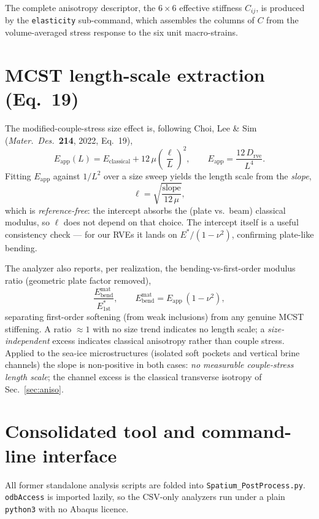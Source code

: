 \documentclass[11pt]{article}
\newcommand{\code}[1]{\texttt{\small #1}}
\begin{document}
The complete anisotropy descriptor, the $6\times6$ effective stiffness
$C_{ij}$, is produced by the \code{elasticity} sub-command, which assembles the
columns of $C$ from the volume-averaged stress response to the six unit
macro-strains.

\section{MCST length-scale extraction (Eq.~19)}
\label{sec:eq19}
The modified-couple-stress size effect is, following Choi, Lee \& Sim
(\textit{Mater.\ Des.}\ \textbf{214}, 2022, Eq.~19),
\begin{equation}
  E_\text{app}(L)=E_\text{classical}+12\,\mu\left(\frac{\ell}{L}\right)^{2},
  \qquad E_\text{app}=\frac{12\,D_\text{rve}}{L^{4}} .
  \label{eq:eq19}
\end{equation}
Fitting $E_\text{app}$ against $1/L^2$ over a size sweep yields the length scale
from the \emph{slope},
\begin{equation}
  \ell=\sqrt{\frac{\text{slope}}{12\,\mu}},
\end{equation}
which is \emph{reference-free}: the intercept absorbs the (plate vs.\ beam)
classical modulus, so $\ell$ does not depend on that choice. The intercept itself
is a useful consistency check --- for our RVEs it lands on $E^\ast/(1-\nu^2)$,
confirming plate-like bending.

The analyzer also reports, per realization, the bending-vs-first-order modulus
ratio (geometric plate factor removed),
\begin{equation}
  \frac{E_\text{bend}^\text{mat}}{E^\ast_\text{1st}},
  \qquad E_\text{bend}^\text{mat}=E_\text{app}\,(1-\nu^2),
\end{equation}
separating first-order softening (from weak inclusions) from any genuine MCST
stiffening. A ratio $\approx 1$ with no size trend indicates no length scale;
a \emph{size-independent} excess indicates classical anisotropy rather than
couple stress. Applied to the sea-ice microstructures (isolated soft pockets and
vertical brine channels) the slope is non-positive in both cases: \emph{no
measurable couple-stress length scale}; the channel excess is the classical
transverse isotropy of Sec.~\ref{sec:aniso}.

\section{Consolidated tool and command-line interface}
\label{sec:cli}
All former standalone analysis scripts are folded into
\code{Spatium\_PostProcess.py}. \code{odbAccess} is imported lazily, so the
CSV-only analyzers run under a plain \code{python3} with no Abaqus licence.
\end{document}
